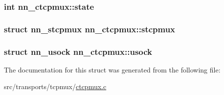 \subsubsection[{state}]{\setlength{\rightskip}{0pt plus 5cm}int nn\+\_\+ctcpmux\+::state}\hypertarget{structnn__ctcpmux_ab0103503ff213fe896f4d45ceea723ca}{}\label{structnn__ctcpmux_ab0103503ff213fe896f4d45ceea723ca}
\subsubsection[{stcpmux}]{\setlength{\rightskip}{0pt plus 5cm}struct {\bf nn\+\_\+stcpmux} nn\+\_\+ctcpmux\+::stcpmux}\hypertarget{structnn__ctcpmux_a53e694d9e610eb735da294988afc48e2}{}\label{structnn__ctcpmux_a53e694d9e610eb735da294988afc48e2}
\subsubsection[{usock}]{\setlength{\rightskip}{0pt plus 5cm}struct {\bf nn\+\_\+usock} nn\+\_\+ctcpmux\+::usock}\hypertarget{structnn__ctcpmux_ae5c270ad3b4d7e376ed0d4a0f876e4ad}{}\label{structnn__ctcpmux_ae5c270ad3b4d7e376ed0d4a0f876e4ad}


The documentation for this struct was generated from the following file\+:\begin{DoxyCompactItemize}
\item 
src/transports/tcpmux/\hyperlink{ctcpmux_8c}{ctcpmux.\+c}\end{DoxyCompactItemize}
